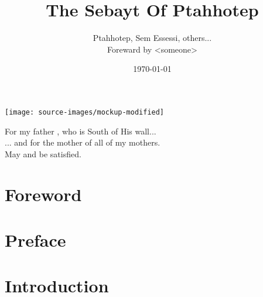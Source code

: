 \documentclass[a4paper,pagesize,8pt,pointlessnumbers,normalheadings,oneside]{book}
\title{The Sebayt Of Ptahhotep}
\author{Ptahhotep, Sem Essessi, others...\\Foreward by <someone>}
\date{\today}
\begin{document}
\maketitle

\vspace*{\fill}
\begin{center}
\texttt{[image: source-images/mockup-modified]}
\end{center}
\vspace*{\fill}
\pagebreak

\vspace*{\fill}
\begin{center}
For my father , who is South of His wall...\\
\vspace{7.5mm}
... and for  the mother of all of my mothers.\\
\vspace{15mm}
May  and  be satisfied.\\
\end{center}
\vspace*{\fill}

\tableofcontents

\markboth{}{}

\newlength\q
\setlength{}

\chapter*{Foreword}

\markboth{}{}

\chapter*{Preface}

\markboth{}{}

\chapter*{Introduction}


\pagebreak

\printindex
\end{document}

